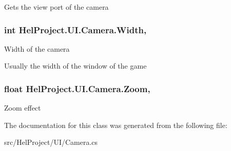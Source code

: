 Gets the view port of the camera 

\hypertarget{class_hel_project_1_1_u_i_1_1_camera_ad16cc9589cf14533997a8f090c67f509}{}
\subsubsection[{Width}]{\setlength{\rightskip}{0pt plus 5cm}int Hel\+Project.\+U\+I.\+Camera.\+Width\hspace{0.3cm}{\ttfamily [get]}, {\ttfamily [set]}}\label{class_hel_project_1_1_u_i_1_1_camera_ad16cc9589cf14533997a8f090c67f509}


Width of the camera 

Usually the width of the window of the game \hypertarget{class_hel_project_1_1_u_i_1_1_camera_a785b2a428a8b4f4401e208a2e1396d42}{}
\subsubsection[{Zoom}]{\setlength{\rightskip}{0pt plus 5cm}float Hel\+Project.\+U\+I.\+Camera.\+Zoom\hspace{0.3cm}{\ttfamily [get]}, {\ttfamily [set]}}\label{class_hel_project_1_1_u_i_1_1_camera_a785b2a428a8b4f4401e208a2e1396d42}


Zoom effect 



The documentation for this class was generated from the following file\+:\begin{DoxyCompactItemize}
\item 
src/\+Hel\+Project/\+U\+I/Camera.\+cs\end{DoxyCompactItemize}
